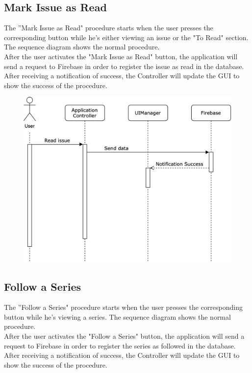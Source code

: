 \clearpage

\subsection{Mark Issue as Read}
The ”Mark Issue as Read" procedure starts when the user presses the corresponding button while he's either viewing an issue or the "To Read" section. The sequence diagram shows the normal procedure. \\
After the user activates the "Mark Issue as Read" button, the application will send a request to Firebase in order to register the issue as read in the database. \\
After receiving a notification of success, the Controller will update the GUI to show the success of the procedure. 

\vspace{5mm}

\begin{figure}[h]
\centering
\includegraphics[width=\textwidth]{img/seqdiagrams/readissue}
\end{figure}

\clearpage

\subsection{Follow a Series}
The ”Follow a Series" procedure starts when the user presses the corresponding button while he's viewing a series. The sequence diagram shows the normal procedure. \\
After the user activates the "Follow a Series" button, the application will send a request to Firebase in order to register the series as followed in the database. \\
After receiving a notification of success, the Controller will update the GUI to show the success of the procedure. 

